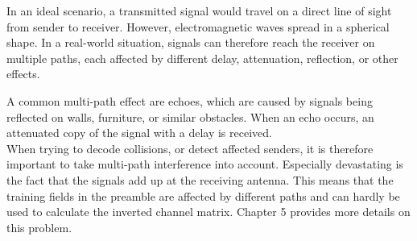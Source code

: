 In an ideal scenario, a transmitted signal would travel on a direct line of sight from sender to receiver. However, electromagnetic waves spread in a spherical shape. In a real-world situation, signals can therefore reach the receiver on multiple paths, each affected by different delay, attenuation, reflection, or other effects.

A common multi-path effect are echoes, which are caused by signals being reflected on walls, furniture, or similar obstacles. When an echo occurs, an attenuated copy of the signal with a delay is received.\\

When trying to decode collisions, or detect affected senders, it is therefore important to take multi-path interference into account. Especially devastating is the fact that the signals add up at the receiving antenna. This means that the training fields in the preamble are affected by different paths and can hardly be used to calculate the inverted channel matrix. Chapter 5 provides more details on this problem.
